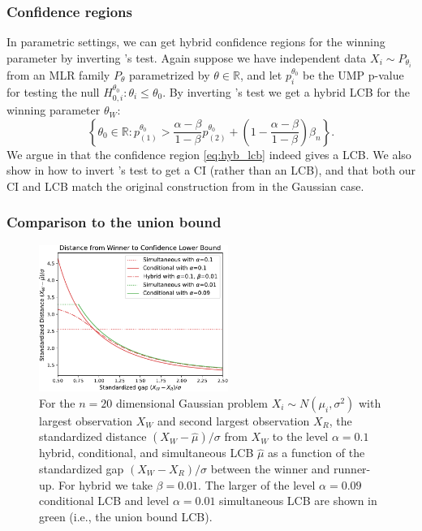 \documentclass{article}
\newcommand{\R}{\mathbb{R}}
\begin{document}
\subsubsection{Confidence regions}

In parametric settings, we can get hybrid confidence regions for the winning parameter by inverting 's test. Again suppose we have independent data $X_i \sim P_{\theta_i}$ from an MLR family $P_{\theta}$ parametrized by $\theta \in \R$, and let $p_i^{\theta_0}$ be the UMP p-value for testing the null $H^{\theta_0}_{0, i} : \theta_i \leq \theta_0$. By inverting 's test we get a hybrid LCB for the winning parameter $\theta_W$:
\begin{equation}
    \label{eq:hyb_lcb}
    \left\{ \theta_0 \in \R:  p^{\theta_0}_{(1)} > \frac{\alpha-\beta}{1-\beta}p^{\theta_0}_{(2)}  + \left(1 - \frac{\alpha - \beta}{1 - \beta}\right) \beta_n \right\}.
\end{equation}
We argue in  that the confidence region \eqref{eq:hyb_lcb} indeed gives a LCB. We also show in  how to invert 's test to get a CI (rather than an LCB), and that both our CI and LCB match the original construction from \cite{Andrews2023} in the Gaussian case. 

\subsubsection{Comparison to the union bound}

\begin{figure}[]
    \centering
    \includegraphics[width=0.55\textwidth]{hyb_dist_to_winner.pdf}
    \caption{For the $n = 20$ dimensional Gaussian problem $X_i \sim N(\mu_i, \sigma^2)$ with largest observation $X_W$ and second largest observation $X_R$, the standardized distance $(X_W - \hat{\mu})/\sigma$ from $X_W$ to the level $\alpha = 0.1$ hybrid, conditional, and simultaneous LCB $\hat{\mu}$ as a function of the standardized gap $(X_W - X_R)/\sigma$ between the winner and runner-up. For hybrid we take $\beta = 0.01$. The larger of the level $\alpha = 0.09$ conditional LCB and level $\alpha = 0.01$ simultaneous LCB are shown in green (i.e., the union
    bound LCB).}
    \label{fig:hybrid}
\end{figure}
\end{document}
